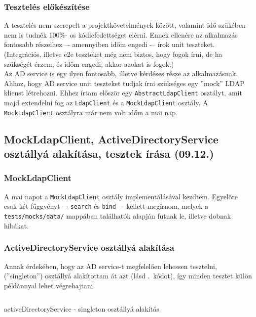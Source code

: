 \documentclass[a4paper]{article}
\newcommand{\inlts}[1]{\texttt{#1}}
\begin{document}
\subsubsection*{Tesztelés előkészítése}
A tesztelés nem szerepelt a projektkövetelmények között, valamint idő szűkében nem is tudnék 100\%-
os kódlefedettséget elérni. Ennek ellenére az alkalmazás fontosabb részeihez –- amennyiben időm
engedi -– írok unit teszteket. (Integrációs, illetve e2e teszteket még nem biztos, hogy fogok írni, de ha
szükségét érzem, és időm engedi, akkor azokat is fogok.) \\

Az AD service is egy ilyen fontosabb, illetve kérdéses része az alkalmazásnak. Ahhoz, hogy AD service
unit teszteket tudjak írni szükséges egy ''mock'' LDAP klienst létrehozni. Ehhez írtam először egy
\inlts{AbstractLdapClient} osztályt, amit majd extendelni fog az \inlts{LdapClient} és a \inlts{MockLdapClient}
osztály. A \inlts{MockLdapClient} osztályra már nem volt időm a mai nap.

\subsection{MockLdapClient, ActiveDirectoryService osztállyá a\-la\-kí\-tá\-sa, tesztek
írása (09.12.)}

\subsubsection*{MockLdapClient}

A mai napot a \inlts{MockLdapClient} osztály implementálásával kezdtem. Egyelőre csak két függvényt –-
\inlts{search} és \inlts{bind} –- kellett megírnom, melyek a \inlts{tests/mocks/data/} mappában találhatók alapján
futnak le, illetve dobnak hibákat.

\subsubsection*{ActiveDirectoryService osztállyá alakítása}

Annak érdekében, hogy az AD service-t megfelelően lehessen tesztelni, (''singleton'') osztállyá
alakítottam át azt (lásd .~kódot), így minden tesztet külön példánnyal lehet végrehajtani.

\begin{listing}[!ht]
\inputminted[bgcolor=codebg, breaklines, breakanywhere, fontsize=\small]{typescript}{code/activeDirectoryServiceSingleton.ts}
\caption{activeDirectoryService - singleton osztállyá alakítás}
\label{listing:active_directory_service_singleton}
\end{listing}
\end{document}
